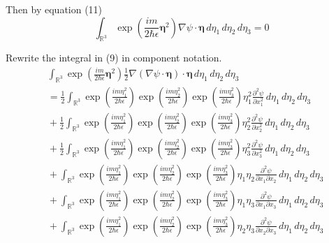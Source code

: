 Then by equation (11)
\begin{equation*}
\int_{\mathbb R^3}
\exp\left(\frac{im}{2\hbar\epsilon}\boldsymbol\eta^2\right)
\nabla\psi\cdot\boldsymbol\eta
\,d\eta_1\,d\eta_2\,d\eta_3=0
\tag{14}
\end{equation*}

Rewrite the integral in (9) in component notation.
\begin{align*}
&\int_{\mathbb R^3}
\exp\left(\frac{im}{2\hbar\epsilon}\boldsymbol\eta^2\right)
\tfrac{1}{2}
\nabla(\nabla\psi\cdot\boldsymbol\eta)\cdot\boldsymbol\eta
\,d\eta_1\,d\eta_2\,d\eta_3
\\
&{}=\frac{1}{2}\int_{\mathbb R^3}
\exp\left(\frac{im\eta_1^2}{2\hbar\epsilon}\right)
\exp\left(\frac{im\eta_2^2}{2\hbar\epsilon}\right)
\exp\left(\frac{im\eta_3^2}{2\hbar\epsilon}\right)
\eta_1^2\frac{\partial^2\psi}{\partial x_1^2}
\,d\eta_1\,d\eta_2\,d\eta_3
\\
&{}+\frac{1}{2}\int_{\mathbb R^3}
\exp\left(\frac{im\eta_1^2}{2\hbar\epsilon}\right)
\exp\left(\frac{im\eta_2^2}{2\hbar\epsilon}\right)
\exp\left(\frac{im\eta_3^2}{2\hbar\epsilon}\right)
\eta_2^2\frac{\partial^2\psi}{\partial x_2^2}
\,d\eta_1\,d\eta_2\,d\eta_3
\\
&{}+\frac{1}{2}\int_{\mathbb R^3}
\exp\left(\frac{im\eta_1^2}{2\hbar\epsilon}\right)
\exp\left(\frac{im\eta_2^2}{2\hbar\epsilon}\right)
\exp\left(\frac{im\eta_3^2}{2\hbar\epsilon}\right)
\eta_3^2\frac{\partial^2\psi}{\partial x_3^2}
\,d\eta_1\,d\eta_2\,d\eta_3
\\
&{}+\int_{\mathbb R^3}
\exp\left(\frac{im\eta_1^2}{2\hbar\epsilon}\right)
\exp\left(\frac{im\eta_2^2}{2\hbar\epsilon}\right)
\exp\left(\frac{im\eta_3^2}{2\hbar\epsilon}\right)
\eta_1\eta_2\frac{\partial^2\psi}{\partial x_1\partial x_2}
\,d\eta_1\,d\eta_2\,d\eta_3
\\
&{}+\int_{\mathbb R^3}
\exp\left(\frac{im\eta_1^2}{2\hbar\epsilon}\right)
\exp\left(\frac{im\eta_2^2}{2\hbar\epsilon}\right)
\exp\left(\frac{im\eta_3^2}{2\hbar\epsilon}\right)
\eta_1\eta_3\frac{\partial^2\psi}{\partial x_1\partial x_3}
\,d\eta_1\,d\eta_2\,d\eta_3
\\
&{}+\int_{\mathbb R^3}
\exp\left(\frac{im\eta_1^2}{2\hbar\epsilon}\right)
\exp\left(\frac{im\eta_2^2}{2\hbar\epsilon}\right)
\exp\left(\frac{im\eta_3^2}{2\hbar\epsilon}\right)
\eta_2\eta_3\frac{\partial^2\psi}{\partial x_2\partial x_3}
\,d\eta_1\,d\eta_2\,d\eta_3
\end{align*}

